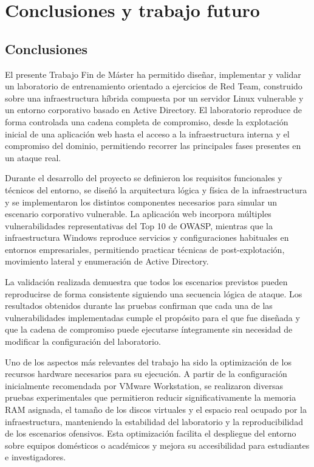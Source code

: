 \vspace*{-0.75cm}


\section{Conclusiones y trabajo futuro} %
\label{sec:conclusiones_y_trabajo_futuro}
\vspace{1cm}

\subsection{Conclusiones}

El presente Trabajo Fin de Máster ha permitido diseñar, implementar y validar un laboratorio de entrenamiento orientado a ejercicios de Red Team, construido sobre una infraestructura híbrida compuesta por un servidor Linux vulnerable y un entorno corporativo basado en Active Directory. El laboratorio reproduce de forma controlada una cadena completa de compromiso, desde la explotación inicial de una aplicación web hasta el acceso a la infraestructura interna y el compromiso del dominio, permitiendo recorrer las principales fases presentes en un ataque real.

Durante el desarrollo del proyecto se definieron los requisitos funcionales y técnicos del entorno, se diseñó la arquitectura lógica y física de la infraestructura y se implementaron los distintos componentes necesarios para simular un escenario corporativo vulnerable. La aplicación web incorpora múltiples vulnerabilidades representativas del Top 10 de OWASP, mientras que la infraestructura Windows reproduce servicios y configuraciones habituales en entornos empresariales, permitiendo practicar técnicas de post-explotación, movimiento lateral y enumeración de Active Directory.

La validación realizada demuestra que todos los escenarios previstos pueden reproducirse de forma consistente siguiendo una secuencia lógica de ataque. Los resultados obtenidos durante las pruebas confirman que cada una de las vulnerabilidades implementadas cumple el propósito para el que fue diseñada y que la cadena de compromiso puede ejecutarse íntegramente sin necesidad de modificar la configuración del laboratorio.

Uno de los aspectos más relevantes del trabajo ha sido la optimización de los recursos hardware necesarios para su ejecución. A partir de la configuración inicialmente recomendada por VMware Workstation, se realizaron diversas pruebas experimentales que permitieron reducir significativamente la memoria RAM asignada, el tamaño de los discos virtuales y el espacio real ocupado por la infraestructura, manteniendo la estabilidad del laboratorio y la reproducibilidad de los escenarios ofensivos. Esta optimización facilita el despliegue del entorno sobre equipos domésticos o académicos y mejora su accesibilidad para estudiantes e investigadores.

